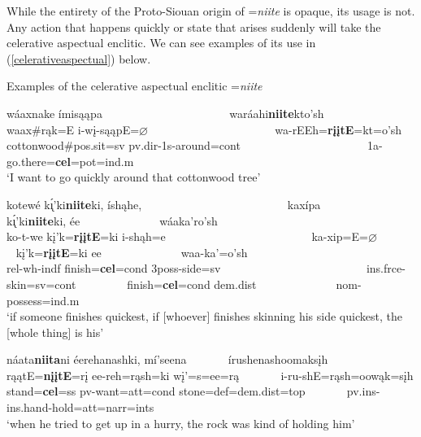 While the entirety of the Proto-Siouan origin of =\textit{niite} is opaque, its usage is not. Any action that happens quickly or state that arises suddenly will take the celerative aspectual enclitic. We can see examples of its use in (\ref{celerativeaspectual}) below.

\begin{exe}

\item\label{celerativeaspectual} Examples of the celerative aspectual enclitic =\textit{niite}

	\begin{xlist}
	
	\item\label{celerativeaspectual1}
	\glll wáaxnake ímisąąpa ~ ~ ~ ~ ~ ~ ~ ~ ~ ~ ~ ~ ~ waráahi\textbf{niite}kto'sh\\
	waax\#rąk=E i-wį-sąąpE=$\varnothing$ ~ ~ ~ ~ ~ ~ ~ ~ ~ ~ ~ ~ ~  wa-rEEh=\textbf{rįįtE}=kt=o'sh\\
	\textnormal{cottonwood}\#pos.sit=sv pv.dir-1s-\textnormal{around}=cont ~ ~ ~ ~ ~ ~ ~ ~ ~ ~ ~ ~ ~  1a-\textnormal{go.there}=\textbf{cel}=pot=ind.m\\
	\glt `I want to go quickly around that cottonwood tree' \citep[147]{hollow1973a}

	\item\label{celerativeaspectual2}
	\glll kotewé k\'{ı̨}'ki\textbf{niite}ki, íshąhe, ~ ~ ~ ~ ~ ~ ~ ~ ~ ~ ~ ~ ~ ~ ~ kaxípa ~ ~ ~ ~ ~  k\'{ı̨}'ki\textbf{niite}ki, ée ~ ~ ~ ~ ~ ~ ~ ~ wáaka'ro'sh\\
	ko-t-we kį'k=\textbf{rįįtE}=ki i-shąh=e ~ ~ ~ ~ ~ ~ ~ ~ ~ ~ ~ ~ ~ ~ ~ ka-xip=E=$\varnothing$ ~ ~ ~ ~ ~ kį'k=\textbf{rįįtE}=ki ee ~ ~ ~ ~ ~ ~ ~ ~ waa-ka'=o'sh\\
	rel-wh-indf \textnormal{finish}=\textbf{cel}=cond 3poss-\textnormal{side}=sv ~ ~ ~ ~ ~ ~ ~ ~ ~ ~ ~ ~ ~ ~ ~ ins.frce-\textnormal{skin}=sv=cont ~ ~ ~ ~ ~ \textnormal{finish}=\textbf{cel}=cond dem.dist ~ ~ ~ ~ ~ ~ ~ ~ nom-\textnormal{possess}=ind.m\\
	\glt `if someone finishes quickest, if [whoever] finishes skinning his side quickest, the [whole thing] is his' \citep[42]{hollow1973a}

	\item\label{celerativeaspectual3}
	\glll náata\textbf{niita}ni éerehanashki, mí'seena ~ ~ ~ ~ írushenashoomaksįh\\
	rąątE=\textbf{nįįtE}=rį ee-reh=rąsh=ki wį'=s=ee=rą ~ ~ ~ ~ i-ru-shE=rąsh=oowąk=sįh\\
	\textnormal{stand}=\textbf{cel}=ss pv-\textnormal{want}=att=cond \textnormal{stone}=def=dem.dist=top ~ ~ ~ ~  pv.ins-ins.hand-\textnormal{hold}=att=narr=ints\\
	\glt `when he tried to get up in a hurry, the rock was kind of holding him' \citep[45]{hollow1973a}


\end{xlist}
\end{exe}
